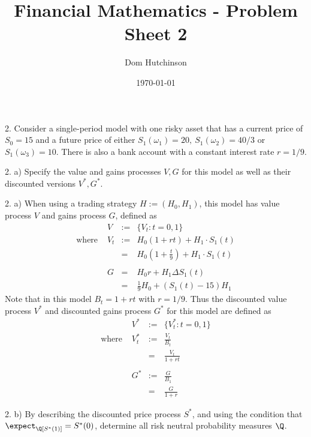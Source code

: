 \documentclass[11pt,a4paper]{article}
\begin{document}

\title{Financial Mathematics - Problem Sheet 2}
\author{Dom Hutchinson}
\date{\today}
\maketitle

\begin{question}{2.}
  Consider a single-period model with one risky asset that has a current price of $S_0=15$ and a future price of either $S_1(\omega_1)=20,\ S_1(\omega_2)=40/3$ or $S_1(\omega_3)=10$. There is also a bank account with a constant interest rate $r=1/9$.
\end{question}

\begin{question}{2. a)}
  Specify the value and gains processes $V,G$ for this model as well as their discounted versions $V^*,G^*$.
\end{question}

\begin{answer}{2. a)}
  When using a trading strategy $H:=(H_0,H_1)$, this model has value process $V$ and gains process $G$, defined as
  \[\begin{array}{rrrl}
    &V&:=&\{V_t:t=0,1\}\\
    \text{where }&V_t&:=&H_0(1+rt)+H_1\cdot S_1(t)\\
    &&=&H_0\left(1+\frac{t}9\right)+H_1\cdot S_1(t)\\
    \\
    &G&=&H_0r+H_1\Delta S_1(t)\\
    &&=&\frac19H_0+(S_1(t)-15)H_1
  \end{array}\]
  Note that in this model $B_t=1+rt$ with $r=1/9$. Thus the discounted value process $V^*$ and discounted gains process $G^*$ for this model are defined as
  \[\begin{array}{rrcl}
    &V^*&:=&\{V_t^*:t=0,1\}\\
    \text{where }&V_t^*&:=&\frac{V_t}{B_t}\\
    &&=&\frac{V_t}{1+rt}\\
    \\
    &G^*&:=&\frac{G}{B_1}\\
    &&=&\frac{G}{1+r}
  \end{array}\]
\end{answer}

\begin{question}{2. b)}
  By describing the discounted price process $S^*$, and using the condition that $\expect_\Q[S^*(1)]=S^*(0)$, determine all risk neutral probability measures $\Q$.
\end{question}
\end{document}
